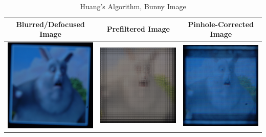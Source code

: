 \begin{table}[h!]
  \centering
    \caption {Huang's Algorithm, Bunny Image}
    \begin{tabular}{| c | c | c |}
    \hline Blurred/Defocused Image & Prefiltered Image & Pinhole-Corrected Image \\ \hline
      \includegraphics[width=1.9in]{chapters/chapter5/images/Huang_OffAxis_380_250_Origin_Bunny.JPG} &
      \includegraphics[width=1.9in]{chapters/chapter5/images/Huang_prefiltered.PNG} &
      \includegraphics[width=1.9in]{chapters/chapter5/images/Huang_OffAxis_380_250_Pinhole_Bunny.JPG} \\ \hline
    \end{tabular}
\end{table}


